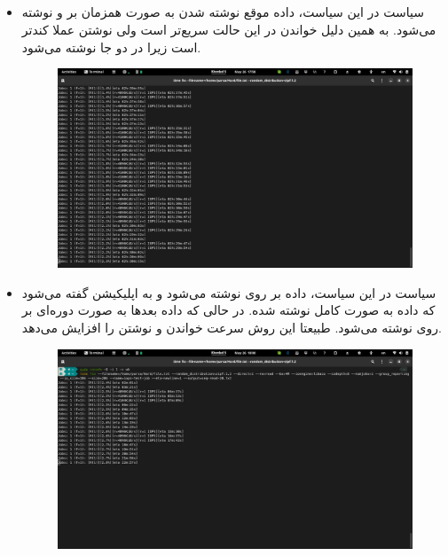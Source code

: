 \documentclass{article}
\begin{document}
\subsection{}
\begin{itemize}
    \item سیاست 
    در این سیاست، داده موقع نوشته شدن به صورت همزمان بر 
    و
    نوشته می‌شود. به همین دلیل خواندن در این حالت سریع‌تر است ولی نوشتن 
    عملا کندتر است زیرا در دو جا نوشته می‌شود.
    \begin{figure}[H]
        \centering
        \includegraphics[width=\textwidth]{images/3-d-wt.png}
    \end{figure}
    \item سیاست 
    در این سیاست، داده بر روی 
    نوشته می‌شود و به اپلیکیشن گفته می‌شود که داده به صورت کامل نوشته شده.
    در حالی که داده بعدها به صورت دوره‌ای بر روی 
    نوشته می‌شود. طبیعتا این روش سرعت خواندن و نوشتن را افزایش می‌دهد.
    \begin{figure}[H]
        \centering
        \includegraphics[width=\textwidth]{images/3-d-wb.png}

\end{figure}
\end{itemize}
\end{document}

